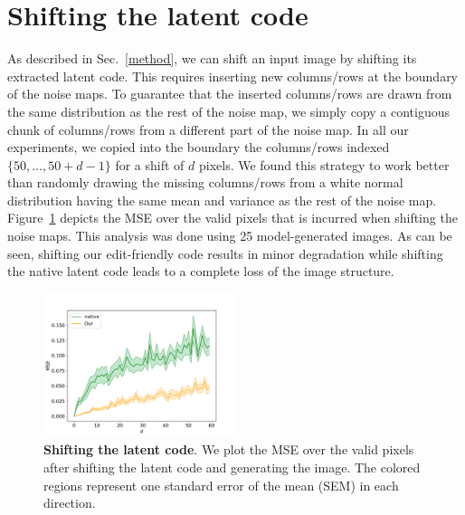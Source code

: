 


\renewcommand\thefigure{S\arabic{figure}}    
\setcounter{figure}{0}  
\renewcommand\theequation{S\arabic{equation}}    
\setcounter{equation}{0}
\renewcommand\thealgorithm{S\arabic{algorithm}}    
\setcounter{algorithm}{0}  
\renewcommand{\thesection}{\Alph{section}}
\renewcommand\thetable{S\arabic{table}}

\section{Shifting the latent code}\label{app:shift}
As described in Sec.~\ref{method}, we can shift an input image by shifting its extracted latent code. This requires inserting new columns/rows at the boundary of the noise maps. To guarantee that the inserted columns/rows are drawn from the same distribution as the rest of the noise map, we simply copy a contiguous chunk of columns/rows from a different part of the noise map. In all our experiments, we copied into the boundary the columns/rows indexed $\{50,\ldots,50+d-1\}$ for a shift of $d$ pixels. We found this strategy to work better than randomly drawing the missing columns/rows from a white normal distribution having the same mean and variance as the rest of the noise map. %
Figure~\ref{fig:shifting_graph} depicts the MSE over the valid pixels that is incurred when shifting the noise maps. This analysis was done using 25 model-generated images. As can be seen, shifting our edit-friendly code results in minor degradation while shifting the native latent code leads to a complete loss of the image structure. 

\begin{figure}[H]
\centering
\includegraphics[width=0.5\textwidth]{ICCV23_submission/figures/mean-err-shifting.pdf}
\caption{\textbf{Shifting the latent code}. We plot the MSE over the valid pixels after shifting the latent code and generating the image. The colored regions represent one standard error of the mean (SEM) in each direction.}
\label{fig:shifting_graph}
\end{figure}

